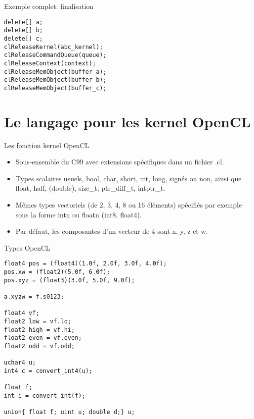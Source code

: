 \documentclass[10pt]{beamer}
\begin{document}
\begin{frame}[fragile]{Exemple complet: finalisation}

  \scriptsize
  \begin{verbatim}
delete[] a;
delete[] b;
delete[] c;
clReleaseKernel(abc_kernel);
clReleaseCommandQueue(queue);
clReleaseContext(context);
clReleaseMemObject(buffer_a);
clReleaseMemObject(buffer_b);
clReleaseMemObject(buffer_c);
  \end{verbatim}
\end{frame}

\section{Le langage pour les kernel OpenCL}

\begin{frame}{Les fonction kernel OpenCL}

  \begin{itemize}
    \item Sous-ensemble du C99 avec extensions spécifiques dans un fichier .cl.

    \item Types scalaires usuels, bool, char, short, int, long, signés ou non, ainsi que float, half, (double), size\_t, ptr\_diff\_t, intptr\_t.

    \item Mêmes types vectoriels (de 2, 3, 4, 8 ou 16 éléments) spécifiés par exemple sous la forme intn ou floatn (int8, float4).

    \item Par défaut, les composantes d'un vecteur de 4 sont x, y, z et w.
  \end{itemize}
\end{frame}

\begin{frame}[fragile]{Types OpenCL}

  \scriptsize
  \begin{verbatim}
float4 pos = (float4)(1.0f, 2.0f, 3.0f, 4.0f);
pos.xw = (float2)(5.0f, 6.0f);
pos.xyz = (float3)(3.0f, 5.0f, 9.0f);

a.xyzw = f.s0123;

float4 vf;
float2 low = vf.lo;
float2 high = vf.hi;
float2 even = vf.even;
float2 odd = vf.odd;

uchar4 u;
int4 c = convert_int4(u);

float f;
int i = convert_int(f);

union{ float f; uint u; double d;} u;
  \end{verbatim}
\end{frame}
\end{document}
